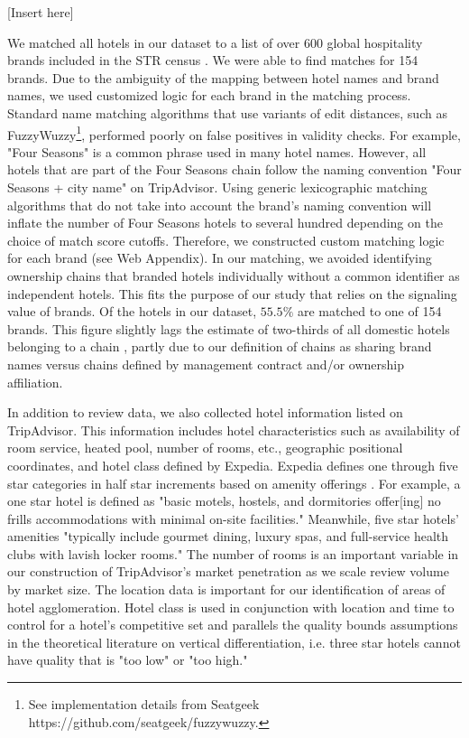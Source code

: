 \documentclass{informs_mod} %
\begin{document}
[Insert  here]

We matched all hotels in our dataset to a list of over 600 global hospitality brands included in the STR census \citep{hotelnews2015}. We were able to find matches for 154 brands. Due to the ambiguity of the mapping between hotel names and brand names, we used customized logic for each brand in the matching process. Standard name matching algorithms that use variants of edit distances, such as FuzzyWuzzy\footnote{See implementation details from Seatgeek https://github.com/seatgeek/fuzzywuzzy.}, performed poorly on false positives in validity checks. For example, "Four Seasons" is a common phrase used in many hotel names. However, all hotels that are part of the Four Seasons chain follow the naming convention "Four Seasons + city name" on TripAdvisor. Using generic lexicographic matching algorithms that do not take into account the brand's naming convention will inflate the number of Four Seasons hotels to several hundred depending on the choice of match score cutoffs. Therefore, we constructed custom matching logic for each brand (see Web Appendix). In our matching, we avoided identifying ownership chains that branded hotels individually without a common identifier as independent hotels. This fits the purpose of our study that relies on the signaling value of brands. Of the hotels in our dataset, $55.5\%$ are matched to one of 154 brands. This figure slightly lags the estimate of two-thirds of all domestic hotels belonging to a chain \citep{lodging2017}, partly due to our definition of chains as sharing brand names versus chains defined by management contract and/or ownership affiliation.

In addition to review data, we also collected hotel information listed on TripAdvisor. This information includes hotel characteristics such as availability of room service, heated pool, number of rooms, etc., geographic positional coordinates, and hotel class defined by Expedia. Expedia defines one through five star categories in half star increments based on amenity offerings \citep{expedia2018ratings}. For example, a one star hotel is defined as "basic motels, hostels, and dormitories offer[ing] no frills accommodations with minimal on-site facilities." Meanwhile, five star hotels' amenities "typically include gourmet dining, luxury spas, and full-service health clubs with lavish locker rooms." The number of rooms is an important variable in our construction of TripAdvisor's market penetration as we scale review volume by market size. The location data is important for our identification of areas of hotel agglomeration. Hotel class is used in conjunction with location and time to control for a hotel's competitive set and parallels the quality bounds assumptions in the theoretical literature on vertical differentiation, i.e. three star hotels cannot have quality that is "too low" or "too high."
\end{document}
